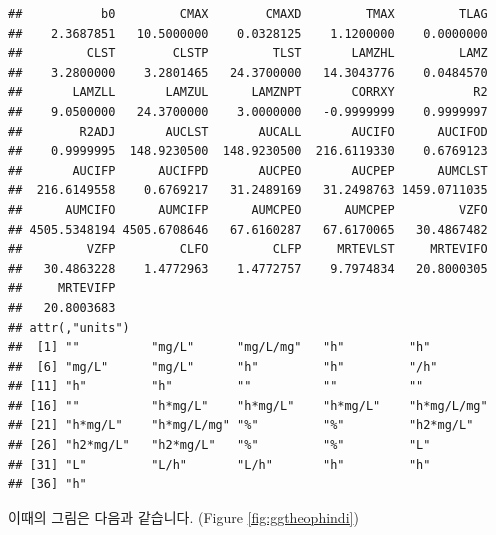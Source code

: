 \documentclass[12pt,]{krantz}
\newenvironment{Shaded}{\begin{snugshade}}{\end{snugshade}}
\newcommand{\KeywordTok}[1]{\textcolor[rgb]{0.13,0.29,0.53}{\textbf{#1}}}
\newcommand{\DataTypeTok}[1]{\textcolor[rgb]{0.13,0.29,0.53}{#1}}
\newcommand{\DecValTok}[1]{\textcolor[rgb]{0.00,0.00,0.81}{#1}}
\newcommand{\StringTok}[1]{\textcolor[rgb]{0.31,0.60,0.02}{#1}}
\newcommand{\CommentTok}[1]{\textcolor[rgb]{0.56,0.35,0.01}{\textit{#1}}}
\newcommand{\OperatorTok}[1]{\textcolor[rgb]{0.81,0.36,0.00}{\textbf{#1}}}
\newcommand{\NormalTok}[1]{#1}
\begin{document}
\begin{Shaded}
\end{Shaded}

\begin{verbatim}
##           b0         CMAX        CMAXD         TMAX         TLAG 
##    2.3687851   10.5000000    0.0328125    1.1200000    0.0000000 
##         CLST        CLSTP         TLST       LAMZHL         LAMZ 
##    3.2800000    3.2801465   24.3700000   14.3043776    0.0484570 
##       LAMZLL       LAMZUL      LAMZNPT       CORRXY           R2 
##    9.0500000   24.3700000    3.0000000   -0.9999999    0.9999997 
##        R2ADJ       AUCLST       AUCALL       AUCIFO      AUCIFOD 
##    0.9999995  148.9230500  148.9230500  216.6119330    0.6769123 
##       AUCIFP      AUCIFPD       AUCPEO       AUCPEP      AUMCLST 
##  216.6149558    0.6769217   31.2489169   31.2498763 1459.0711035 
##      AUMCIFO      AUMCIFP      AUMCPEO      AUMCPEP         VZFO 
## 4505.5348194 4505.6708646   67.6160287   67.6170065   30.4867482 
##         VZFP         CLFO         CLFP     MRTEVLST     MRTEVIFO 
##   30.4863228    1.4772963    1.4772757    9.7974834   20.8000305 
##     MRTEVIFP 
##   20.8003683 
## attr(,"units")
##  [1] ""          "mg/L"      "mg/L/mg"   "h"         "h"        
##  [6] "mg/L"      "mg/L"      "h"         "h"         "/h"       
## [11] "h"         "h"         ""          ""          ""         
## [16] ""          "h*mg/L"    "h*mg/L"    "h*mg/L"    "h*mg/L/mg"
## [21] "h*mg/L"    "h*mg/L/mg" "%"         "%"         "h2*mg/L"  
## [26] "h2*mg/L"   "h2*mg/L"   "%"         "%"         "L"        
## [31] "L"         "L/h"       "L/h"       "h"         "h"        
## [36] "h"
\end{verbatim}

이때의 그림은 다음과 같습니다. (Figure \ref{fig:ggtheophindi})
\end{document}
